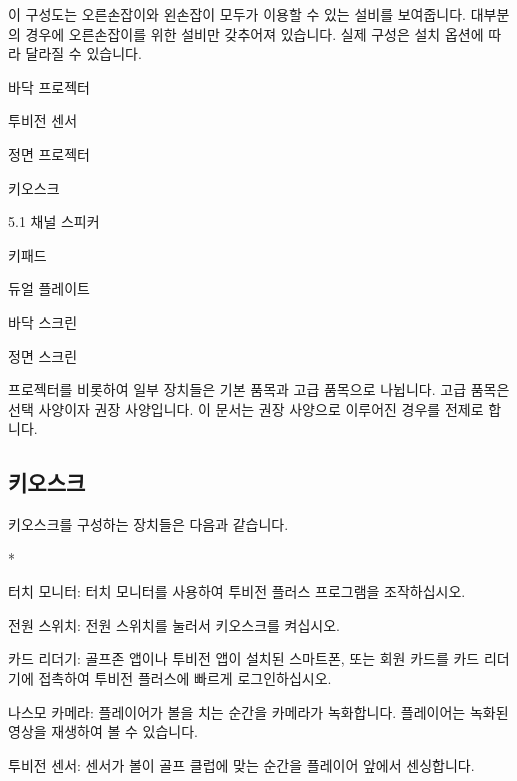 \documentclass[10pt, openright, language=korean]{hzguide}
\begin{document}

\begin{Note}
이 구성도는 오른손잡이와 왼손잡이 모두가 이용할 수 있는 설비를 보여줍니다.
대부분의 경우에 오른손잡이를 위한 설비만 갖추어져 있습니다.
실제 구성은 설치 옵션에 따라 달라질 수 있습니다.
\end{Note}


\begin{callout}
\item 바닥 프로젝터
\item 투비전 센서 
\item 정면 프로젝터
\item 키오스크 
\item 5.1 채널 스피커 
\item 키패드
\item 듀얼 플레이트
\item 바닥 스크린
\item 정면 스크린
\end{callout}

\begin{Note}
프로젝터를 비롯하여 일부 장치들은 기본 품목과 고급 품목으로 나뉩니다.
고급 품목은 선택 사양이자 권장 사양입니다.
이 문서는 권장 사양으로 이루어진 경우를 전제로 합니다.
\end{Note}

\subsection{키오스크}

키오스크를 구성하는 장치들은 다음과 같습니다.


\begin{callout}*
\item 터치 모니터: 터치 모니터를 사용하여 투비전 플러스 프로그램을 조작하십시오.
\item 전원 스위치: 전원 스위치를 눌러서 키오스크를 켜십시오.
\item 카드 리더기: 골프존 앱이나 투비전 앱이 설치된 스마트폰, 또는 회원 카드를 카드 리더기에 접촉하여 투비전 플러스에 빠르게 로그인하십시오.
\item 나스모 카메라: 플레이어가 볼을 치는 순간을 카메라가 녹화합니다. 플레이어는 녹화된 영상을 재생하여 볼 수 있습니다.
\item 투비전 센서: 센서가 볼이 골프 클럽에 맞는 순간을 플레이어 앞에서 센싱합니다.
\end{callout}
\end{document}
